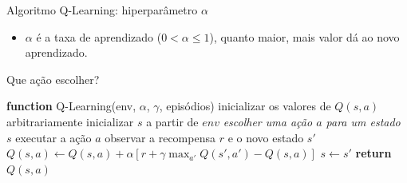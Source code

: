 \documentclass{beamer}
\begin{document}
%
%

\begin{frame}{Algoritmo Q-Learning: hiperparâmetro $\alpha$}
	\begin{itemize}
		\item $\alpha$ é a taxa de aprendizado ($0 < \alpha \leq 1$), quanto maior, mais valor dá ao novo aprendizado.
	\end{itemize}
\end{frame}

\begin{frame}{Que ação escolher?} 
	\small
	\begin{algorithmic} 
		\STATE \textbf{function} Q-Learning(env, $\alpha$, $\gamma$, episódios)
		\STATE inicializar os valores de $Q(s, a)$ arbitrariamente
		\STATE inicializar $s$ a partir de $env$
		\REPEAT
		\STATE \emph{escolher uma ação $a$ para um estado $s$}
		\STATE executar a ação $a$
		\STATE observar a recompensa $r$ e o novo estado $s'$ 
		\STATE $Q(s,a) \leftarrow Q(s,a) + \alpha [r +\gamma \max_{a'}{Q(s', a')} - Q(s,a)]$
		\STATE$s  \leftarrow s'$
		\ENDFOR
		\STATE \textbf{return} $Q(s, a)$
	\end{algorithmic}
\end{frame}
\end{document}
